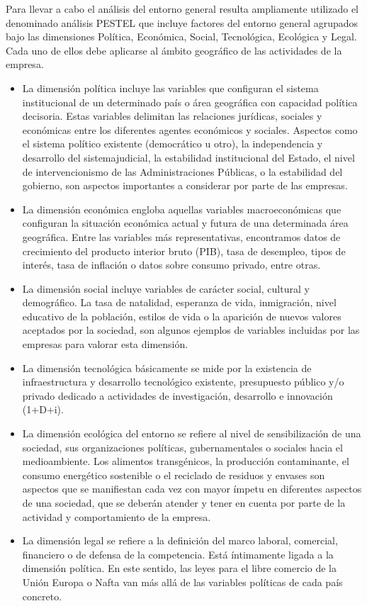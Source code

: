 \documentclass[
]{krantz}
\providecommand{\tightlist}{%
  \setlength{\itemsep}{0pt}\setlength{\parskip}{0pt}}
\begin{document}
Para llevar a cabo el análisis del entorno general resulta ampliamente utilizado el denominado análisis PESTEL \citep{johnson2007} que incluye factores del entorno general agrupados bajo las dimensiones Política, Económica, Social, Tecnológica, Ecológica y Legal. Cada uno de ellos debe aplicarse al ámbito geográfico de las actividades de la empresa.

\begin{itemize}
\tightlist
\item
  La dimensión política incluye las variables que configuran el sistema institucional de un determinado país o área geográfica con capacidad política decisoria. Estas variables delimitan las relaciones jurídicas, sociales y económicas entre los diferentes agentes económicos y sociales. Aspectos como el sistema político existente (democrático u otro), la independencia y desarrollo del sistemajudicial, la estabilidad institucional del Estado, el nivel de intervencionismo de las Administraciones Públicas, o la estabilidad del gobierno, son aspectos importantes a considerar por parte de las empresas.
\item
  La dimensión económica engloba aquellas variables macroeconómicas que configuran la situación económica actual y futura de una determinada área geográfica. Entre las variables más representativas, encontramos datos de crecimiento del producto interior bruto (PIB), tasa de desempleo, tipos de interés, tasa de inflación o datos sobre consumo privado, entre otras.
\item
  La dimensión social incluye variables de carácter social, cultural y demográfico. La tasa de natalidad, esperanza de vida, inmigración, nivel educativo de la población, estilos de vida o la aparición de nuevos valores aceptados por la sociedad, son algunos ejemplos de variables incluidas por las empresas para valorar esta dimensión.
\item
  La dimensión tecnológica básicamente se mide por la existencia de infraestructura y desarrollo tecnológico existente, presupuesto público y/o privado dedicado a actividades de investigación, desarrollo e innovación (1+D+i).
\item
  La dimensión ecológica del entorno se refiere al nivel de sensibilización de una sociedad, sus organizaciones políticas, gubernamentales o sociales hacia el medioambiente. Los alimentos transgénicos, la producción contaminante, el consumo energético sostenible o el reciclado de residuos y envases son aspectos que se manifiestan cada vez con mayor ímpetu en diferentes aspectos de una sociedad, que se deberán atender y tener en cuenta por parte de la actividad y comportamiento de la empresa.
\item
  La dimensión legal se refiere a la definición del marco laboral, comercial, financiero o de defensa de la competencia. Está íntimamente ligada a la dimensión política. En este sentido, las leyes para el libre comercio de la Unión Europa o Nafta van más allá de las variables políticas de cada país concreto.
\end{itemize}
\end{document}
